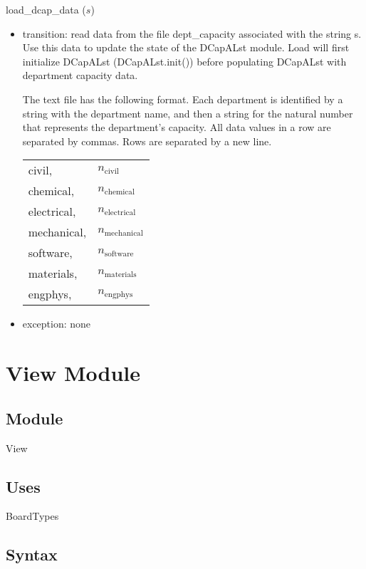 \documentclass[12pt]{article}
\begin{document}
\noindent load\_dcap\_data ($s$)
\begin{itemize}
\item transition: read data from the file dept\_capacity associated with the string s.
  Use this data to update the state of the DCapALst module.  Load will first
  initialize DCapALst (DCapALst.init()) before populating DCapALst with
  department capacity data.

  The text file has the following format.  Each department is identified by a
  string with the department name, and then a string for the natural number that
  represents the department's capacity.  All data values in a row are
  separated by commas.  Rows are separated by a new line.

  \begin{tabular}{ll}
    civil, & $n_\text{civil}$\\
    chemical, & $n_\text{chemical}$\\
    electrical, & $n_\text{electrical}$\\
    mechanical, & $n_\text{mechanical}$\\
    software, & $n_\text{software}$\\
    materials, & $n_\text{materials}$\\
    engphys, & $n_\text{engphys}$\\
  \end{tabular}

\item exception: none
\end{itemize}

\section* {View Module}

\subsection* {Module}

View

\subsection* {Uses}

BoardTypes

\subsection* {Syntax}
\end{document}
